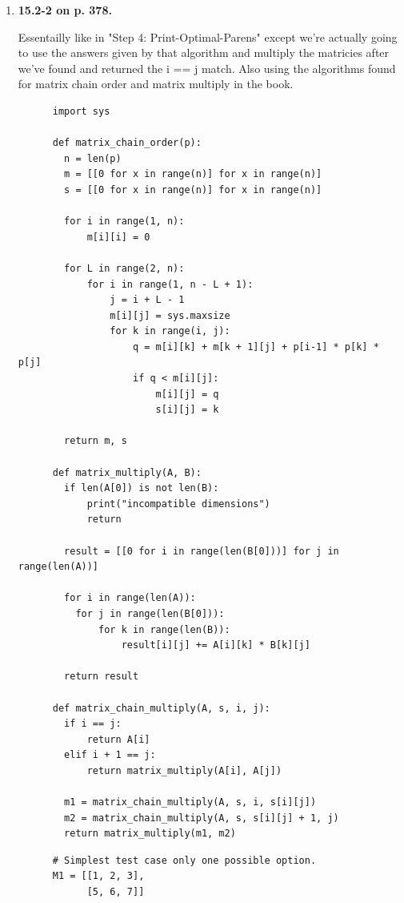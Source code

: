 \documentclass{article}
\begin{document}
\begin{enumerate}
    \item \textbf{15.2-2 on p. 378.}
    
    Essentailly like in "Step 4: Print-Optimal-Parens" except we're actually going to use the answers given by that algorithm and multiply the matricies after we've found and returned the i == j match.
    Also using the algorithms found for matrix chain order and matrix multiply in the book.

    \begin{lstlisting}
      import sys
      
      def matrix_chain_order(p):
        n = len(p)
        m = [[0 for x in range(n)] for x in range(n)]
        s = [[0 for x in range(n)] for x in range(n)]
    
        for i in range(1, n): 
            m[i][i] = 0
    
        for L in range(2, n): 
            for i in range(1, n - L + 1): 
                j = i + L - 1
                m[i][j] = sys.maxsize 
                for k in range(i, j): 
                    q = m[i][k] + m[k + 1][j] + p[i-1] * p[k] * p[j] 
                    if q < m[i][j]: 
                        m[i][j] = q
                        s[i][j] = k
    
        return m, s
  
      def matrix_multiply(A, B):
        if len(A[0]) is not len(B):
            print("incompatible dimensions")
            return
        
        result = [[0 for i in range(len(B[0]))] for j in range(len(A))]
        
        for i in range(len(A)):
          for j in range(len(B[0])):
              for k in range(len(B)):
                  result[i][j] += A[i][k] * B[k][j]
                
        return result
      
      def matrix_chain_multiply(A, s, i, j):
        if i == j:
            return A[i]
        elif i + 1 == j:
            return matrix_multiply(A[i], A[j])
        
        m1 = matrix_chain_multiply(A, s, i, s[i][j])
        m2 = matrix_chain_multiply(A, s, s[i][j] + 1, j)
        return matrix_multiply(m1, m2)      
    \end{lstlisting}

    \begin{lstlisting}
      # Simplest test case only one possible option.
      M1 = [[1, 2, 3],
            [5, 6, 7]]
      

\end{lstlisting}
\end{enumerate}
\end{document}
